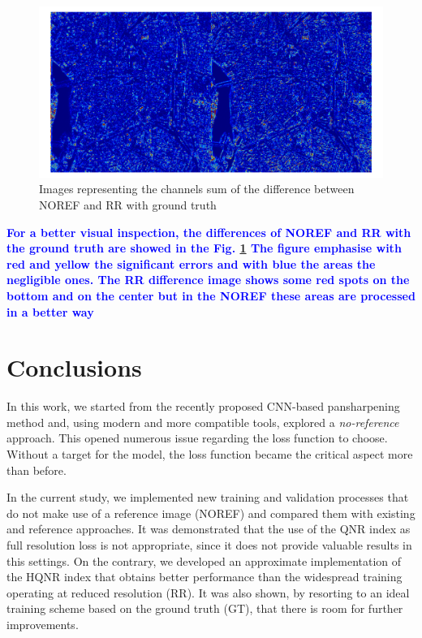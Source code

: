 \documentclass[12pt]{report}
\newcommand{\bb}[1]{\textcolor{blue}{\textbf{#1}}}
\begin{document}
\begin{figure}
    \centering
    \includegraphics[scale=.35]{diff_PAN_NOREF_RR.png}
    \caption{Images representing the channels sum of the difference between NOREF and RR with ground truth}
    \label{fig:diffcolors}
\end{figure}

\bb{For a better visual inspection, the differences of NOREF and RR with the ground truth are showed in the Fig. \ref{fig:diffcolors}
The figure emphasise with red and yellow the significant errors and with blue the areas the negligible ones.
The RR difference image shows some red spots on the bottom and on the center but in the NOREF these areas are processed in a better way}


\chapter*{Conclusions}
In this work, we started from the recently proposed \cite{pnn2} CNN-based pansharpening method and, using modern and more compatible tools, explored a \textit{no-reference} approach.
This opened numerous issue regarding the loss function to choose.
Without a target for the model, the loss function became the critical aspect more than before.

In the current study, we implemented new training and validation processes that do not make use of a reference image (NOREF) and compared them with existing and reference approaches. 
It was demonstrated that the use of the QNR index as full resolution loss is not appropriate, since it does not provide valuable results in this settings. On the contrary, we developed an approximate implementation of the HQNR index that obtains better performance than the widespread training operating at reduced resolution (RR). It was also shown, by resorting to an ideal training scheme based on the ground truth (GT), that there is room for further improvements. 
\end{document}
